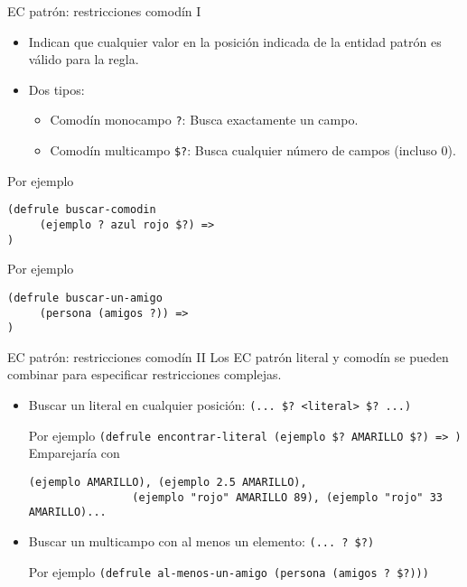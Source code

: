 \documentclass[usenames,dvipsnames,aspectratio=169]{beamer}
\begin{document}
\begin{frame}[fragile]{EC patrón: restricciones comodín I}
	\begin{itemize}
		\item Indican que cualquier valor en la posición indicada de la entidad patrón es válido para la regla.
		\item Dos tipos:
		\begin{itemize}
			\item Comodín monocampo \texttt{?}: Busca exactamente un campo.
			\item Comodín multicampo \texttt{\$?}: Busca cualquier número de campos (incluso 0).
		\end{itemize}
	\end{itemize}
		\begin{minipage}{.4\linewidth}
		\begin{exampleblock}{Por ejemplo}
			\footnotesize
			\begin{verbatim}
(defrule buscar-comodin
     (ejemplo ? azul rojo $?) =>
)
			\end{verbatim}
		\end{exampleblock}
	\end{minipage}
	\hfill
	\begin{minipage}{.5\linewidth}
		\begin{exampleblock}{Por ejemplo}
			\footnotesize
			\begin{verbatim}
(defrule buscar-un-amigo
     (persona (amigos ?)) =>
)
			\end{verbatim}
		\end{exampleblock}
	\end{minipage}
\end{frame}

\begin{frame}[fragile]{EC patrón: restricciones comodín II}
	Los EC patrón literal y comodín se pueden combinar para especificar restricciones complejas.
	\begin{itemize}
		\item Buscar un literal en cualquier posición: \texttt{(... \$? <literal> \$? ...)}
		\begin{exampleblock}{Por ejemplo}
			\footnotesize
			\texttt{(defrule encontrar-literal (ejemplo \$? AMARILLO \$?) => )}\\
			Emparejaría con \begin{verbatim}(ejemplo AMARILLO), (ejemplo 2.5 AMARILLO),
				(ejemplo "rojo" AMARILLO 89), (ejemplo "rojo" 33 AMARILLO)...
		\end{verbatim}
		\end{exampleblock}
		\item Buscar un multicampo con al menos un elemento: \texttt{(... ? \$?)}
		\begin{exampleblock}{Por ejemplo}
			\footnotesize
			\texttt{(defrule al-menos-un-amigo (persona (amigos ? \$?)))}
		\end{exampleblock}
	\end{itemize}
\end{frame}
\end{document}
